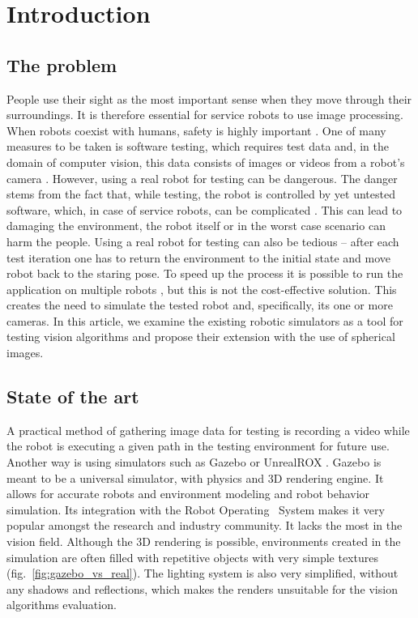 \documentclass{svproc}
\begin{document}
\section{Introduction}

\subsection{The problem}

People use their sight as the most important sense when they move through their surroundings.
It is therefore essential for service robots to use image processing.
When robots coexist with humans, safety is highly important \cite{haddadin2007safety}.
One of many measures to be taken is software testing,
which requires test data and, in the domain of computer vision, this data consists of images or videos from a robot's camera \cite{7759425}.
However, using a real robot for testing can be dangerous.
The danger stems from the fact that, while testing, the robot is controlled by yet untested software, which, in case of service robots, can be complicated \cite{Dudek-multitasking-romoco-2019-twiki}. This can lead to damaging the environment, the robot itself or in the worst case scenario can harm the people.
Using a real robot for testing can also be tedious -- after each test iteration one has to return the environment to the initial state and move robot back to the staring pose.
To speed up the process it is possible to run the application on multiple robots \cite{levine2018learning}, but this is not the cost-effective solution.
This creates the need to simulate the tested robot and, specifically, its one or more cameras. 
In this article, we examine the existing robotic simulators as a tool for testing vision algorithms and propose
their extension with the use of spherical images.

\subsection{State of the art}

A practical method of gathering image data for testing is recording a video while the robot is executing a given path in the testing environment for future use.
Another way is using simulators such as Gazebo \cite{koenig2004design} or UnrealROX \cite{martinez2019unrealrox}.
Gazebo is meant to be a universal simulator, with physics and 3D rendering engine. It allows for accurate 
robots and environment modeling and robot behavior simulation. Its integration with the Robot Operating \
System makes it very popular amongst the research and industry community. It lacks the most in the vision 
field. Although the 3D rendering is possible, environments created in the simulation are often filled
with repetitive objects with very simple textures (fig.~\ref{fig:gazebo_vs_real}).
 The lighting system is also very simplified, without any 
shadows and reflections, which makes the renders unsuitable for the vision algorithms evaluation. 
\end{document}
